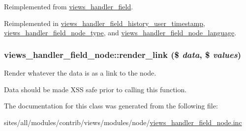 Reimplemented from \hyperlink{classviews__handler__field_82ff951c5e9ceb97b2eab86f880cbc1e}{views\_\-handler\_\-field}.

Reimplemented in \hyperlink{classviews__handler__field__history__user__timestamp_cc2398dad2662ab9d4faf0ea9daba116}{views\_\-handler\_\-field\_\-history\_\-user\_\-timestamp}, \hyperlink{classviews__handler__field__node__type_13c9a516cca49870a1603fdd26071851}{views\_\-handler\_\-field\_\-node\_\-type}, and \hyperlink{classviews__handler__field__node__language_04be837ecac8fcbbb38fb1a17e45263a}{views\_\-handler\_\-field\_\-node\_\-language}.\hypertarget{classviews__handler__field__node_0ea7eeac3500e011ae0a83e67f56508d}{
\subsubsection[{render\_\-link}]{\setlength{\rightskip}{0pt plus 5cm}views\_\-handler\_\-field\_\-node::render\_\-link (\$ {\em data}, \/  \$ {\em values})}}
\label{classviews__handler__field__node_0ea7eeac3500e011ae0a83e67f56508d}


Render whatever the data is as a link to the node.

Data should be made XSS safe prior to calling this function. 

The documentation for this class was generated from the following file:\begin{CompactItemize}
\item 
sites/all/modules/contrib/views/modules/node/\hyperlink{views__handler__field__node_8inc}{views\_\-handler\_\-field\_\-node.inc}\end{CompactItemize}
